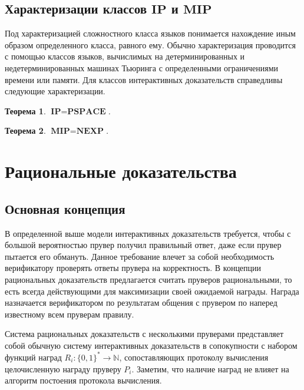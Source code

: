 \documentclass[14pt, a4paper]{extreport}
\newtheorem{theorem}{\indent Теорема}
\newcommand{\word}{\{0, 1\}^*}
\begin{document}
\section{Характеризации классов $\textbf{IP}$ и $\textbf{MIP}$}
Под характеризацией сложностного класса языков понимается нахождение иным образом определенного класса, равного ему. Обычно характеризация проводится с помощью классов языков, вычислимых на детерминированных и недетерминированных машинах Тьюринга с определенными ограничениями времени или памяти. Для классов интерактивных доказательств справедливы следующие характеризации.
\begin{theorem}$\textbf{IP} = \textbf{PSPACE}$.~\cite{shamir1992ip}
\end{theorem}
\begin{theorem}$\textbf{MIP} = \textbf{NEXP}$.~\cite{babai1991mip}\end{theorem}

\chapter{Рациональные доказательства}
\section{Основная концепция}
В определенной выше модели интерактивных доказательств требуется, чтобы с большой вероятностью прувер получил правильный ответ, даже если прувер пытается его обмануть. Данное требование влечет за собой необходимость верификатору проверять ответы прувера на корректность. В концепции рациональных доказательств предлагается считать пруверов рациональными, то есть всегда действующими для максимизации своей ожидаемой награды. Награда назначается верификатором по результатам общения с прувером по наперед известному всем пруверам правилу. 

Система рациональных доказательств с несколькими пруверами представляет собой обычную систему интерактивных доказательств в сопокупности с набором функций наград $R_i: \word \longrightarrow \mathbb{N}$, сопоставляющих протоколу вычисления целочисленную награду пруверу $P_i$. Заметим, что наличие наград не влияет на алгоритм постоения протокола вычисления.
\end{document}
